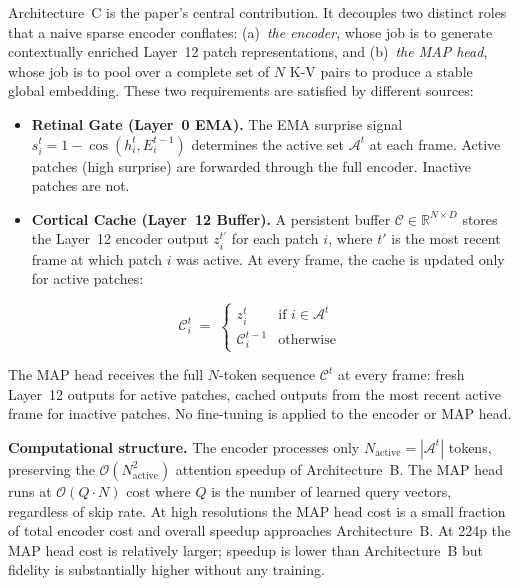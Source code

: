 \documentclass{article}
\begin{document}
Architecture~C is the paper's central contribution. It decouples two
distinct roles that a naive sparse encoder conflates:
(a)~\emph{the encoder}, whose job is to generate contextually enriched
Layer~12 patch representations, and (b)~\emph{the MAP head}, whose job
is to pool over a complete set of $N$ K-V pairs to produce a stable
global embedding. These two requirements are satisfied by different
sources:

\begin{itemize}
    \item \textbf{Retinal Gate (Layer~0 EMA).} The EMA surprise signal
    $s_i^t = 1 - \cos(h_i^t, E_i^{t-1})$ determines the active set
    $\mathcal{A}^t$ at each frame. Active patches (high surprise) are
    forwarded through the full encoder. Inactive patches are not.
    \item \textbf{Cortical Cache (Layer~12 Buffer).} A persistent buffer
    $\mathcal{C} \in \mathbb{R}^{N \times D}$ stores the Layer~12 encoder
    output $z_i^{t'}$ for each patch $i$, where $t'$ is the most recent
    frame at which patch $i$ was active. At every frame, the cache is
    updated only for active patches:
\end{itemize}

\begin{equation}
    \label{eq:cache-update}
    \mathcal{C}_i^t \;=\;
    \begin{cases}
        z_i^t & \text{if } i \in \mathcal{A}^t \\
        \mathcal{C}_i^{t-1} & \text{otherwise}
    \end{cases}
\end{equation}

The MAP head receives the full $N$-token sequence $\mathcal{C}^t$ at
every frame: fresh Layer~12 outputs for active patches, cached outputs
from the most recent active frame for inactive patches. No fine-tuning
is applied to the encoder or MAP head.

\textbf{Computational structure.}
The encoder processes only $N_{\text{active}} = |\mathcal{A}^t|$ tokens,
preserving the $\mathcal{O}(N_{\text{active}}^2)$ attention speedup of
Architecture~B. The MAP head runs at $\mathcal{O}(Q \cdot N)$ cost where
$Q$ is the number of learned query vectors, regardless of skip rate. At
high resolutions the MAP head cost is a small fraction of total encoder
cost and overall speedup approaches Architecture~B. At 224p the MAP head
cost is relatively larger; speedup is lower than Architecture~B but
fidelity is substantially higher without any training.
\end{document}
